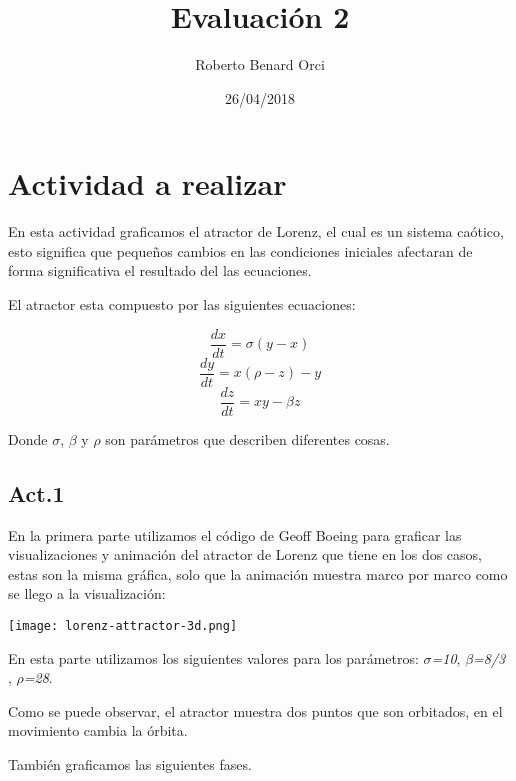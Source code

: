 \documentclass{article}
\title{Evaluación 2}
\author{Roberto Benard Orci}
\date{26/04/2018}
\begin{document}
\maketitle

\section*{Actividad a realizar}
En esta actividad graficamos el atractor de Lorenz, el cual es un sistema caótico, esto significa que pequeños cambios en las condiciones iniciales afectaran de forma significativa el resultado del las ecuaciones. 

El atractor esta compuesto por las siguientes ecuaciones:

 \begin{equation}
 \frac{dx}{dt} =\sigma (y-x)
 \end{equation}
 \begin{equation}
 \frac{dy}{dt} =x (\rho-z)-y
 \end{equation}
  \begin{equation}
 \frac{dz}{dt} =xy-\beta z
 \end{equation}

Donde $\sigma$, $\beta$ y $\rho$ son parámetros que describen diferentes cosas.

\subsection*{Act.1}

En la primera parte utilizamos el código de Geoff Boeing para graficar las visualizaciones y animación del atractor de Lorenz que tiene en los dos casos, estas son la misma gráfica, solo que la animación muestra marco por marco como se llego a la visualización:

\begin{center}
	\texttt{[image: lorenz-attractor-3d.png]}
    
\end{center}
\vspace{0.3cm}

En esta parte utilizamos los siguientes valores para los parámetros: $\sigma$\textit{=10}, $\beta$\textit{=8/3} , $\rho$\textit{=28}.

Como se puede observar, el atractor muestra dos puntos que son orbitados, en el movimiento cambia la órbita.

\vspace{0.4cm}

También graficamos las siguientes fases. 
\end{document}
